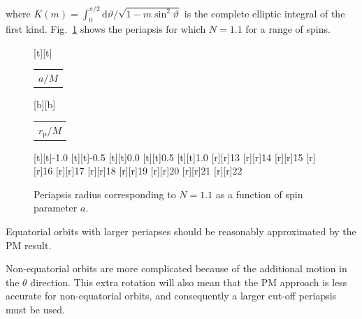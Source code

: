\documentclass[aps,prd,reprint,showpacs,groupedaddress]{revtex4-1}
\newcommand{\Figref}[1]{Fig.~\ref{fig:#1}}
\newcommand{\dd}{\ensuremath{\mathrm{d}}}
\begin{document}
where $K(m) = \int_{0}^{\pi/2}{\dd\vartheta/\sqrt{1-m\sin^2\vartheta}}$ is the complete elliptic integral of the first kind. \Figref{N_peri} shows the periapsis for which $N = 1.1$ for a range of spins.
\begin{figure}
\begin{psfrags}%
\psfragscanon%
%
[t][t]{\color[rgb]{0,0,0}\setlength{\tabcolsep}{0pt}\begin{tabular}{c}{\Large$a/M$}\end{tabular}}%
[b][b]{\color[rgb]{0,0,0}\setlength{\tabcolsep}{0pt}\begin{tabular}{c}{\Large$r_\text{p}/M$}\end{tabular}}%
%
[t][t]{-1.0}%
[t][t]{-0.5}%
[t][t]{0.0}%
[t][t]{0.5}%
[t][t]{1.0}%
%
[r][r]{13}%
[r][r]{14}%
[r][r]{15}%
[r][r]{16}%
[r][r]{17}%
[r][r]{18}%
[r][r]{19}%
[r][r]{20}%
[r][r]{21}%
[r][r]{22}%

%
%
\end{psfrags}%
\caption{Periapsis radius corresponding to $N = 1.1$ as a function of spin parameter $a$.\label{fig:N_peri}}
\end{figure}
Equatorial orbits with larger periapses should be reasonably approximated by the PM result.

Non-equatorial orbits are more complicated because of the additional motion in the $\theta$ direction. This extra rotation will also mean that the PM approach is less accurate for non-equatorial orbits, and consequently a larger cut-off periapsis must be used.
\end{document}
